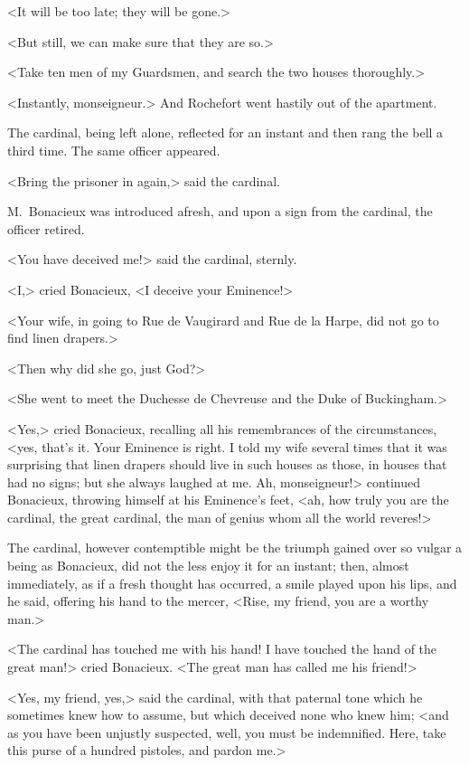 <It will be too late; they will be gone.> 

<But still, we can make sure that they are so.> 

<Take ten men of my Guardsmen, and search the two houses thoroughly.> 

<Instantly, monseigneur.> And Rochefort went hastily out of the apartment. 

The cardinal, being left alone, reflected for an instant and then rang the bell a third time. The same officer appeared. 

<Bring the prisoner in again,> said the cardinal. 

M.~Bonacieux was introduced afresh, and upon a sign from the cardinal, the officer retired. 

<You have deceived me!> said the cardinal, sternly. 

<I,> cried Bonacieux, <I deceive your Eminence!> 

<Your wife, in going to Rue de Vaugirard and Rue de la Harpe, did not go to find linen drapers.> 

<Then why did she go, just God?> 

<She went to meet the Duchesse de Chevreuse and the Duke of Buckingham.> 

<Yes,> cried Bonacieux, recalling all his remembrances of the circumstances, <yes, that's it. Your Eminence is right. I told my wife several times that it was surprising that linen drapers should live in such houses as those, in houses that had no signs; but she always laughed at me. Ah, monseigneur!> continued Bonacieux, throwing himself at his Eminence's feet, <ah, how truly you are the cardinal, the great cardinal, the man of genius whom all the world reveres!> 

The cardinal, however contemptible might be the triumph gained over so vulgar a being as Bonacieux, did not the less enjoy it for an instant; then, almost immediately, as if a fresh thought has occurred, a smile played upon his lips, and he said, offering his hand to the mercer, <Rise, my friend, you are a worthy man.> 

<The cardinal has touched me with his hand! I have touched the hand of the great man!> cried Bonacieux. <The great man has called me his friend!> 

<Yes, my friend, yes,> said the cardinal, with that paternal tone which he sometimes knew how to assume, but which deceived none who knew him; <and as you have been unjustly suspected, well, you must be indemnified. Here, take this purse of a hundred pistoles, and pardon me.> 

